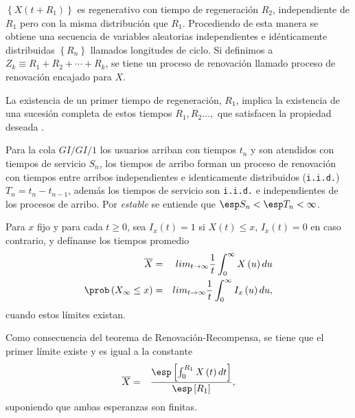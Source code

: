 $\left\{X\left(t+R_{1}\right)\right\}$ es regenerativo con tiempo de regeneraci\'on $R_{2}$, independiente de $R_{1}$ pero con la misma distribuci\'on que $R_{1}$. Procediendo de esta manera se obtiene una secuencia de variables aleatorias independientes e id\'enticamente distribuidas $\left\{R_{n}\right\}$ llamados longitudes de ciclo. Si definimos a $Z_{k}\equiv R_{1}+R_{2}+\cdots+R_{k}$, se tiene un proceso de renovaci\'on llamado proceso de renovaci\'on encajado para $X$.


\begin{Note}
La existencia de un primer tiempo de regeneraci\'on, $R_{1}$, implica la existencia de una sucesi\'on completa de estos tiempos $R_{1},R_{2}\ldots,$ que satisfacen la propiedad deseada \cite{Sigman2}.
\end{Note}


\begin{Note} Para la cola $GI/GI/1$ los usuarios arriban con tiempos $t_{n}$ y son atendidos con tiempos de servicio $S_{n}$, los tiempos de arribo forman un proceso de renovaci\'on  con tiempos entre arribos independientes e identicamente distribuidos (\texttt{i.i.d.})$T_{n}=t_{n}-t_{n-1}$, adem\'as los tiempos de servicio son \texttt{i.i.d.} e independientes de los procesos de arribo. Por \textit{estable} se entiende que $\esp S_{n}<\esp T_{n}<\infty$.
\end{Note}
 


\begin{Def}
Para $x$ fijo y para cada $t\geq0$, sea $I_{x}\left(t\right)=1$ si $X\left(t\right)\leq x$,  $I_{x}\left(t\right)=0$ en caso contrario, y def\'inanse los tiempos promedio
\begin{eqnarray*}
\overline{X}&=&lim_{t\rightarrow\infty}\frac{1}{t}\int_{0}^{\infty}X\left(u\right)du\\
\prob\left(X_{\infty}\leq x\right)&=&lim_{t\rightarrow\infty}\frac{1}{t}\int_{0}^{\infty}I_{x}\left(u\right)du,
\end{eqnarray*}
cuando estos l\'imites existan.
\end{Def}

Como consecuencia del teorema de Renovaci\'on-Recompensa, se tiene que el primer l\'imite  existe y es igual a la constante
\begin{eqnarray*}
\overline{X}&=&\frac{\esp\left[\int_{0}^{R_{1}}X\left(t\right)dt\right]}{\esp\left[R_{1}\right]},
\end{eqnarray*}
suponiendo que ambas esperanzas son finitas.
 

